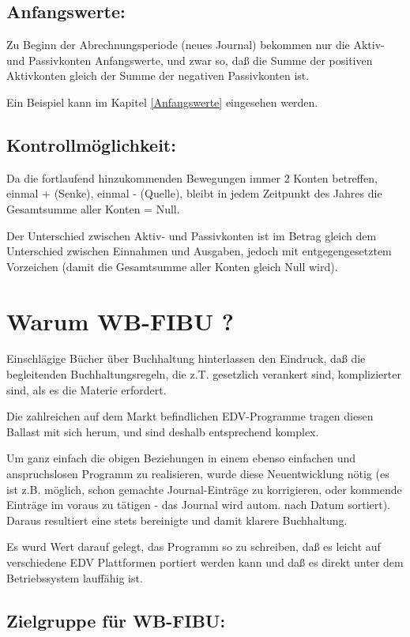 \documentclass[12pt]{report}
\begin{document}
\subsection{Anfangswerte:} 

Zu Beginn der Abrechnungsperiode (neues Journal) bekommen nur die Aktiv- und
Passivkonten Anfangswerte, und zwar so, daß die Summe der positiven
Aktivkonten gleich der Summe der negativen Passivkonten ist.  

Ein Beispiel kann im Kapitel \ref{Anfangswerte} eingesehen werden.

\subsection{Kontrollmöglichkeit:} 

Da die fortlaufend hinzukommenden Bewegungen immer 2 Konten betreffen, einmal +
(Senke), einmal - (Quelle), bleibt in jedem Zeitpunkt des Jahres die
Gesamtsumme aller Konten = Null.

Der Unterschied zwischen Aktiv- und Passivkonten ist im Betrag gleich dem
Unterschied zwischen Einnahmen und Ausgaben, jedoch mit entgegengesetztem
Vorzeichen (damit die Gesamtsumme aller Konten gleich Null wird).

\section{Warum WB-FIBU ?}

Einschlägige Bücher über Buchhaltung hinterlassen den Eindruck, daß die
begleitenden Buchhaltungsregeln, die z.T.  gesetzlich verankert sind,
  komplizierter sind, als es die Materie erfordert.

Die zahlreichen auf dem Markt befindlichen EDV-Programme tragen diesen Ballast
mit sich herum, und sind deshalb entsprechend komplex. 

Um ganz einfach die obigen Beziehungen in einem ebenso einfachen und
anspruchslosen Programm zu realisieren, wurde diese Neuentwicklung nötig (es
ist z.B. möglich, schon gemachte Journal-Einträge zu korrigieren, oder
kommende Einträge im voraus zu tätigen - das Journal wird autom. nach Datum
sortiert). Daraus resultiert eine stets bereinigte und damit klarere
Buchhaltung.

Es wurd Wert darauf gelegt, das Programm so zu schreiben, daß es leicht auf
verschiedene EDV Plattformen portiert werden kann und daß es direkt unter dem
Betriebssystem lauffähig ist.

\subsection{Zielgruppe für WB-FIBU:} 
\end{document}
